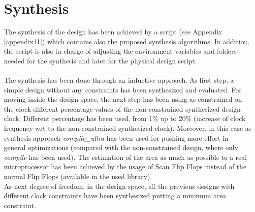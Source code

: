 \chapter{Synthesis}
\label{Synthesis}
The synthesis of the design has been achieved by a script (see Appendix \ref{appendix11}) which contains also the proposed synthesis algorithms. In addition, the script is also in charge of adjusting the environment variables and folders needed for the synthesis and later for the physical design script.\\\\
The synthesis has been done through an inductive approach. As first step, a simple design without any constraints has been synthesized and evaluated. For moving inside the design space, the next step has been using as constrained on the clock different percentage values of the non-constrained synthesized design clock. Different percentage has been used, from 1\% up to 20\% (increase of clock frequency wrt to the non-constrained synthesized clock). Moreover, in this case as synthesis approach \textit{compile\_ultra} has been used for pushing more effort in general optimizations (compared with the non-constrained design, where only \textit{compile} has been used). The estimation of the area as much as possible to a real microprocessor has been achieved by the usage of Scan Flip Flops instead of the normal Flip Flops (available in the used library).\\
As next degree of freedom, in the design space, all the previous designs with different clock constraints have been synthesized putting a minimum area constraint.

